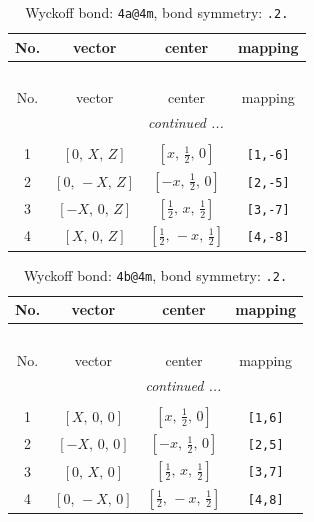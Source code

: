 \documentclass[fleqn,8pt]{jsarticle}
\begin{document}
\begin{longtable}{cccc}
\caption{Wyckoff bond: {\tt 4a@4m}, bond symmetry: {\tt .2.}}
 \\
 \hline \hline
No. & vector & center & mapping \\ \hline \endfirsthead

\multicolumn{3}{l}{\tablename\ \thetable{}} \\
 \hline \hline
No. & vector & center & mapping \\ \hline \endhead

 \hline \hline
\multicolumn{3}{r}{\footnotesize\it continued ...} \\ \endfoot

 \hline \hline
\multicolumn{3}{r}{} \\ \endlastfoot

1 & $\left[ 0,\, X,\, Z \right]$ & $\left[ x,\, \frac{1}{2},\, 0 \right]$ & {\tt [1,-6]} \\ \hline
2 & $\left[ 0,\, - X,\, Z \right]$ & $\left[ - x,\, \frac{1}{2},\, 0 \right]$ & {\tt [2,-5]} \\ \hline
3 & $\left[ - X,\, 0,\, Z \right]$ & $\left[ \frac{1}{2},\, x,\, \frac{1}{2} \right]$ & {\tt [3,-7]} \\ \hline
4 & $\left[ X,\, 0,\, Z \right]$ & $\left[ \frac{1}{2},\, - x,\, \frac{1}{2} \right]$ & {\tt [4,-8]} \\
\end{longtable}
\renewcommand{\arraystretch}{1.2}
\begin{longtable}{cccc}
\caption{Wyckoff bond: {\tt 4b@4m}, bond symmetry: {\tt .2.}}
 \\
 \hline \hline
No. & vector & center & mapping \\ \hline \endfirsthead

\multicolumn{3}{l}{\tablename\ \thetable{}} \\
 \hline \hline
No. & vector & center & mapping \\ \hline \endhead

 \hline \hline
\multicolumn{3}{r}{\footnotesize\it continued ...} \\ \endfoot

 \hline \hline
\multicolumn{3}{r}{} \\ \endlastfoot

1 & $\left[ X,\, 0,\, 0 \right]$ & $\left[ x,\, \frac{1}{2},\, 0 \right]$ & {\tt [1,6]} \\ \hline
2 & $\left[ - X,\, 0,\, 0 \right]$ & $\left[ - x,\, \frac{1}{2},\, 0 \right]$ & {\tt [2,5]} \\ \hline
3 & $\left[ 0,\, X,\, 0 \right]$ & $\left[ \frac{1}{2},\, x,\, \frac{1}{2} \right]$ & {\tt [3,7]} \\ \hline
4 & $\left[ 0,\, - X,\, 0 \right]$ & $\left[ \frac{1}{2},\, - x,\, \frac{1}{2} \right]$ & {\tt [4,8]} \\
\end{longtable}
\end{document}
